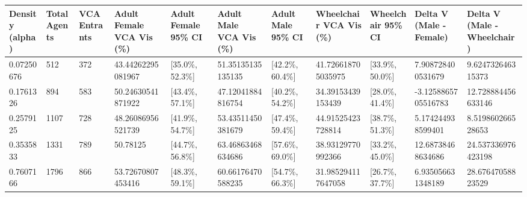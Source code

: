 \begin{tabular}{lllllllllll}
\hline
Density (alpha) & Total Agents & VCA Entrants & Adult Female VCA Vis (\%) & Adult Female 95\% CI & Adult Male VCA Vis (\%) & Adult Male 95\% CI & Wheelchair VCA Vis (\%) & Wheelchair 95\% CI & Delta V (Male - Female) & Delta V (Male - Wheelchair) \\ \hline
0.07250676 & 512 & 372 & 43.44262295081967 & [35.0\%, 52.3\%] & 51.35135135135135 & [42.2\%, 60.4\%] & 41.726618705035975 & [33.9\%, 50.0\%] & 7.908728400531679 & 9.624732646315373 \\
0.1761326 & 894 & 583 & 50.24630541871922 & [43.4\%, 57.1\%] & 47.12041884816754 & [40.2\%, 54.2\%] & 34.39153439153439 & [28.0\%, 41.4\%] & -3.1258865705516783 & 12.728884456633146 \\
0.2579125 & 1107 & 728 & 48.26086956521739 & [41.9\%, 54.7\%] & 53.43511450381679 & [47.4\%, 59.4\%] & 44.91525423728814 & [38.7\%, 51.3\%] & 5.174244938599401 & 8.519860266528653 \\
0.3535833 & 1331 & 789 & 50.78125 & [44.7\%, 56.8\%] & 63.46863468634686 & [57.6\%, 69.0\%] & 38.93129770992366 & [33.2\%, 45.0\%] & 12.68738468634686 & 24.537336976423198 \\
0.7607166 & 1796 & 866 & 53.72670807453416 & [48.3\%, 59.1\%] & 60.66176470588235 & [54.7\%, 66.3\%] & 31.985294117647058 & [26.7\%, 37.7\%] & 6.935056631348189 & 28.67647058823529 \\
\hline
\end{tabular}
